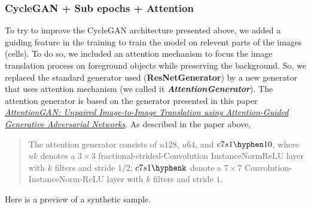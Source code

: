 \documentclass[]{article}
\begin{document}
\subsubsection{CycleGAN + Sub epochs + Attention}
To try to improve the CycleGAN architecture presented above, we added a guiding feature in the training to train the model on relevent parts of the images (cells). To do so, we included an attention mechanism to focus the image translation process on foreground objects while preserving the background. So, we replaced the standard generator used (\textbf{ResNetGenerator}) by a new generator that uses attention mechanism (we called it \textit{\textbf{AttentionGenerator}}). The attention generator is based on the generator presented in this paper \href{https://arxiv.org/abs/1911.11897}{\textit{AttentionGAN: Unpaired Image-to-Image Translation using Attention-Guided Generative Adversarial Networks}}. As described in the paper above, \begin{quote}
The attention generator consists of $u128$, $u64$, and $c7s1\hyphen10$, where $uk$ denotes a $3×3$ fractional-strided-Convolution InstanceNormReLU layer with $k$ filters and stride $1/2$; $c7s1\hyphenk$ denote a $7×7$ Convolution-InstanceNorm-ReLU layer with $k$ filters and stride $1$.
\end{quote}
Here is a preview of a synthetic sample. 
\end{document}
